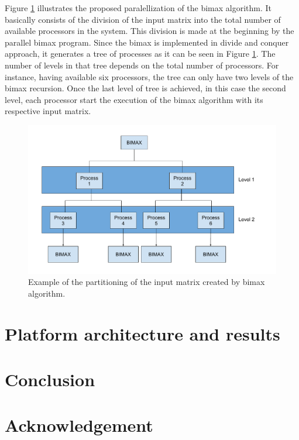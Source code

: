 \documentclass[a4paper,conference]{IEEEtran}
\begin{document}
Figure \ref{fig:parbimax} illustrates the proposed paralellization of the bimax algorithm. It basically consists of the division of the input matrix into the total number of available processors in the system. This division is made at the beginning by the parallel bimax program. Since the bimax is implemented in divide and conquer approach, it generates a tree of processes as it can be seen in Figure \ref{fig:parbimax}. The number of levels in that tree depends on the total number of processors. For instance, having available six processors, the tree can only have two levels of the bimax recursion. Once the last level of tree is achieved, in this case the second level, each processor start the execution of the bimax algorithm with its respective input matrix. 

\begin{figure}[ht!]
  \includegraphics[width=\linewidth]{./img/bimax.pdf}
  \caption{Example of the partitioning of the input matrix created by bimax algorithm.}
  \label{fig:parbimax}
\end{figure}


%
%
%
%



\section{Platform architecture and results}

\section{Conclusion}

\section{Acknowledgement}




\balance 
\end{document}
